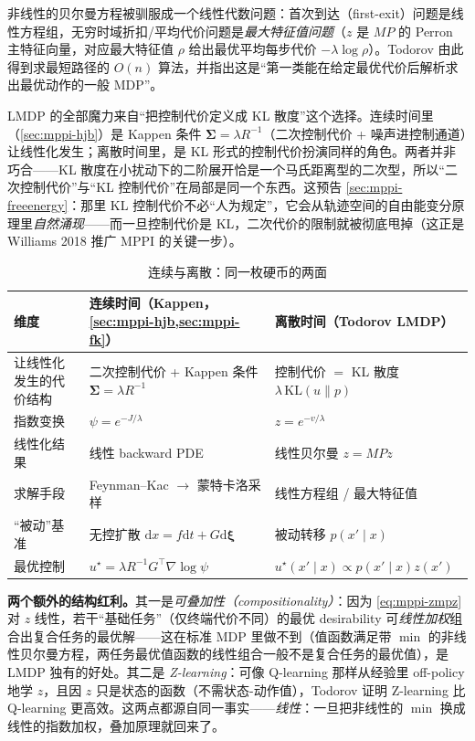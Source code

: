 \noindent 非线性的贝尔曼方程被驯服成一个线性代数问题：首次到达（first-exit）问题是线性方程组，无穷时域折扣/平均代价问题是\emph{最大特征值问题}（$z$ 是 $MP$ 的 Perron 主特征向量，对应最大特征值 $\rho$ 给出最优平均每步代价 $-\lambda\log\rho$）。Todorov 由此得到求最短路径的 $O(n)$ 算法，并指出这是“第一类能在给定最优代价后解析求出最优动作的一般 MDP”\cite{todorov2009efficient}。

\begin{insight}[KL 控制代价 = 离散侧的 Kappen 条件]
LMDP 的全部魔力来自“把控制代价定义成 KL 散度”这个选择。连续时间里（\cref{sec:mppi-hjb}）是 Kappen 条件 $\boldsymbol{\Sigma}=\lambda R^{-1}$（二次控制代价 + 噪声进控制通道）让线性化发生；离散时间里，是 KL 形式的控制代价扮演同样的角色。两者并非巧合——KL 散度在小扰动下的二阶展开恰是一个马氏距离型的二次型，所以“二次控制代价”与“KL 控制代价”在局部是同一个东西。这预告 \cref{sec:mppi-freeenergy}：那里 KL 控制代价不必“人为规定”，它会从轨迹空间的自由能变分原理里\emph{自然涌现}——而一旦控制代价是 KL，二次代价的限制就被彻底甩掉（这正是 Williams 2018 推广 MPPI 的关键一步）。
\end{insight}

\begin{table}[H]\centering\small
\caption{连续与离散：同一枚硬币的两面}
\label{tab:mppi-cont-disc}
\begin{tabular}{lll}
\toprule
维度 & 连续时间（Kappen，\cref{sec:mppi-hjb,sec:mppi-fk}） & 离散时间（Todorov LMDP） \\
\midrule
让线性化发生的代价结构 & 二次控制代价 + Kappen 条件 $\boldsymbol{\Sigma}=\lambda R^{-1}$ & 控制代价 $=$ KL 散度 $\lambda\,\mathrm{KL}(u\|p)$ \\
指数变换 & $\psi=e^{-J/\lambda}$ & $z=e^{-v/\lambda}$ \\
线性化结果 & 线性 backward PDE & 线性贝尔曼 $z=MPz$ \\
求解手段 & Feynman--Kac $\to$ 蒙特卡洛采样 & 线性方程组 / 最大特征值 \\
“被动”基准 & 无控扩散 $\mathrm{d}x=f\mathrm{d}t+G\mathrm{d}\boldsymbol{\xi}$ & 被动转移 $p(x'\mid x)$ \\
最优控制 & $u^\star=\lambda R^{-1}G^\top\nabla\log\psi$ & $u^\star(x'\mid x)\propto p(x'\mid x)z(x')$ \\
\bottomrule
\end{tabular}
\end{table}

\noindent \textbf{两个额外的结构红利。}其一是\emph{可叠加性（compositionality）}：因为 \cref{eq:mppi-zmpz} 对 $z$ 线性，若干“基础任务”（仅终端代价不同）的最优 desirability 可\emph{线性加权}组合出复合任务的最优解——这在标准 MDP 里做不到（值函数满足带 $\min$ 的非线性贝尔曼方程，两任务最优值函数的线性组合一般不是复合任务的最优值），是 LMDP 独有的好处\cite{todorov2009compositionality}。其二是 \emph{Z-learning}：可像 Q-learning 那样从经验里 off-policy 地学 $z$，且因 $z$ 只是状态的函数（不需状态-动作值），Todorov 证明 Z-learning 比 Q-learning 更高效\cite{todorov2009efficient}。这两点都源自同一事实——\emph{线性}：一旦把非线性的 $\min$ 换成线性的指数加权，叠加原理就回来了。

